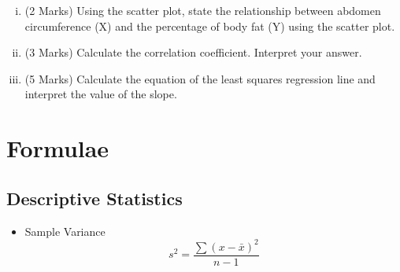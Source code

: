 \documentclass[a4paper,12pt]{article}
\begin{document}
%
%


\begin{enumerate}[(i)]
	
	\item (2 Marks) Using the scatter plot, state the relationship between abdomen circumference (X) and the percentage of body fat (Y) using the scatter plot.
	
	
	
	
	
	\item (3 Marks) Calculate the correlation coefficient. Interpret your answer.
	\item (5 Marks) Calculate the equation of the least squares regression line and interpret the value of the slope.
\end{enumerate}
%










\newpage

\section*{Formulae}
\subsection*{Descriptive Statistics}
\begin{itemize}
	\item Sample Variance
	\begin{equation*}
	s^2 = \frac{\sum (x-\bar{x})^2}{n-1}
	\end{equation*}
\end{itemize}
\end{document}
